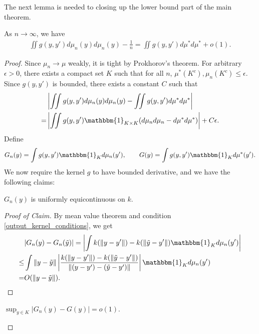 The next lemma is needed to closing up the lower bound part of the main theorem.
\begin{lemma} \label{output_kernel_int_lemma}
    As $n \to \infty$, we have
    \begin{align}
        \iint g(y,y')d\mu_n(y) d\mu_n(y) - \frac{1}{n} = \iint g(y,y')d\mu^* d\mu^* + o(1).
    \end{align}
\end{lemma}
\begin{proof}
    Since $\mu_n \to \mu$ weakly, it is tight by Prokhorov's theorem. For arbitrary $\epsilon >0$, there exists a compact set $K$ such that for all $n$, $\mu^*(K^c),\mu_n(K^c) \leq \epsilon$. Since $g(y,y')$ is bounded, there exists a constant $C$ such that
    \begin{align}
          & \left|\iint g(y,y')d\mu_n(y) d\mu_n(y) - \iint g(y,y')d\mu^* d\mu^*\right| \nonumber            \\
        = & \left|\iint g(y,y') \mathbbm{1}_{K \times K}(d\mu_n d\mu_n - d\mu^* d\mu^*)\right| + C\epsilon.
    \end{align}
    Define
    \begin{align}
        G_n(y) = \int g(y,y') \mathbbm{1}_K d\mu_n(y'), \qquad G(y) = \int g(y,y') \mathbbm{1}_K d\mu^*(y').
    \end{align}
    We now require the kernel $g$ to have bounded derivative, and we have the following claims:
    \begin{claim} \label{claim_1}
        $G_n(y)$ is uniformly equicontinuous on $k$.
    \end{claim}
    \begin{proof}[Proof of Claim]
        By mean value theorem and condition \ref{output_kernel_conditions}, we get
        \begin{align}
                 & |G_n(y)-G_n(\tilde{y})| = \left|\int k(\norm{y-y'}) - k(\norm{\tilde{y}-y'}) \mathbbm{1}_K d\mu_n(y')\right| \nonumber                              \\
            \leq & \int \norm{y-\tilde{y}}\left|\frac{k(\norm{y-y'}) - k(\norm{\tilde{y}-y'})}{\norm{(y-y')-(\tilde{y}-y')}} \right|\mathbbm{1}_K d\mu_n(y') \nonumber \\
            =    & O(\norm{y-\tilde{y}}).
        \end{align}
    \end{proof}
    \begin{claim} \label{claim_2}
        $\sup_{y \in K}|G_n(y)-G(y)|=o(1)$.
    \end{claim}

\end{proof}

